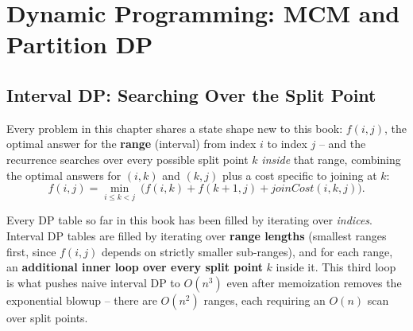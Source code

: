 \chapter{Dynamic Programming: MCM and Partition DP}

\section{Interval DP: Searching Over the Split Point}
\label{sec:dp-partition-intro}

Every problem in this chapter shares a state shape new to this book:
$f(i,j)$, the optimal answer for the \textbf{range} (interval) from
index $i$ to index $j$ -- and the recurrence searches over every
possible split point $k$ \emph{inside} that range, combining the
optimal answers for $(i,k)$ and $(k,j)$ plus a cost specific to joining
at $k$:
\[
  f(i,j) = \min_{i \le k < j}\ \Big( f(i,k) + f(k{+}1,j) +
  \textit{joinCost}(i,k,j) \Big).
\]

\begin{ideabox}
Every DP table so far in this book has been filled by iterating over
\emph{indices}. Interval DP tables are filled by iterating over
\textbf{range lengths} (smallest ranges first, since $f(i,j)$ depends
on strictly smaller sub-ranges), and for each range, an
\textbf{additional inner loop over every split point} $k$ inside it.
This third loop is what pushes naive interval DP to $O(n^3)$ even after
memoization removes the exponential blowup -- there are $O(n^2)$ ranges,
each requiring an $O(n)$ scan over split points.
\end{ideabox}

